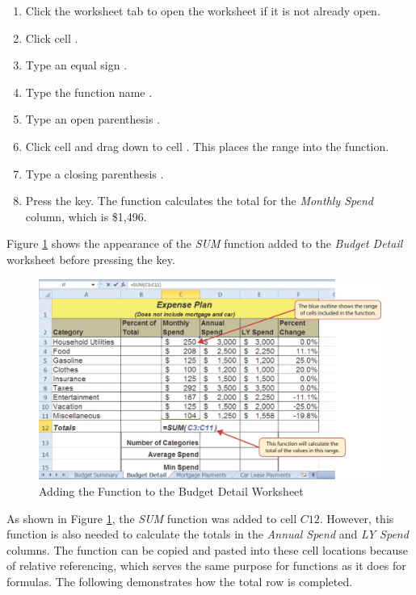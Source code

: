 \begin{enumerate}
	\item Click the  worksheet tab to open the worksheet if it is not already open.
	\item Click cell .
	\item Type an equal sign \fmtTyping{=}.
	\item Type the function name .
	\item Type an open parenthesis \fmtTyping{(}.
	\item Click cell  and drag down to cell . This places the range  into the function.
	\item Type a closing parenthesis \fmtTyping{)}.
	\item Press the  key. The function calculates the total for the \textit{Monthly Spend} column, which is \$1,496.
\end{enumerate}

Figure \ref{02:fig11} shows the appearance of the \textit{SUM} function added to the \textit{Budget Detail} worksheet before pressing the  key.

\begin{figure}[H]
	\centering
	\includegraphics[width=\maxwidth{.95\linewidth}]{gfx/ch02_fig11}
	\caption{Adding the  Function to the Budget Detail Worksheet}
	\label{02:fig11}
\end{figure}

As shown in Figure \ref{02:fig11}, the \textit{SUM} function was added to cell $ C12 $. However, this function is also needed to calculate the totals in the \textit{Annual Spend} and \textit{LY Spend} columns. The function can be copied and pasted into these cell locations because of relative referencing, which serves the same purpose for functions as it does for formulas. The following demonstrates how the total row is completed.


